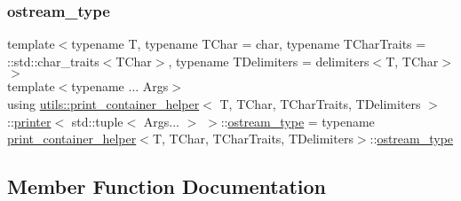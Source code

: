 \subsubsection{\texorpdfstring{ostream\_type}{ostream\_type}}
{\footnotesize\ttfamily template$<$typename T, typename T\+Char = char, typename T\+Char\+Traits = \+::std\+::char\+\_\+traits$<$\+T\+Char$>$, typename T\+Delimiters = delimiters$<$\+T, T\+Char$>$$>$ \\
template$<$typename ... Args$>$ \\
using \mbox{\hyperlink{structutils_1_1print__container__helper}{utils\+::print\+\_\+container\+\_\+helper}}$<$ T, T\+Char, T\+Char\+Traits, T\+Delimiters $>$\+::\mbox{\hyperlink{structutils_1_1print__container__helper_1_1printer}{printer}}$<$ std\+::tuple$<$ Args... $>$ $>$\+::\mbox{\hyperlink{structutils_1_1print__container__helper_1_1printer_3_01std_1_1tuple_3_01_args_8_8_8_01_4_01_4_a7a89933fa31d7a79f454cdf36211a73a}{ostream\+\_\+type}} =  typename \mbox{\hyperlink{structutils_1_1print__container__helper}{print\+\_\+container\+\_\+helper}}$<$T, T\+Char, T\+Char\+Traits, T\+Delimiters$>$\+::\mbox{\hyperlink{structutils_1_1print__container__helper_1_1printer_3_01std_1_1tuple_3_01_args_8_8_8_01_4_01_4_a7a89933fa31d7a79f454cdf36211a73a}{ostream\+\_\+type}}}



\subsection{Member Function Documentation}
\mbox{\label{structutils_1_1print__container__helper_1_1printer_3_01std_1_1tuple_3_01_args_8_8_8_01_4_01_4_a7eb293dd1d715368075eeec5e16c0759}} 

